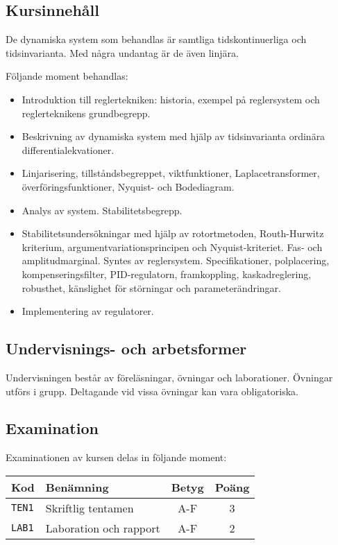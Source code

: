 \subsection*{Kursinnehåll}

De dynamiska system som behandlas är samtliga tidskontinuerliga och
tidsinvarianta. Med några undantag är de även linjära.

Följande moment behandlas:

\begin{itemize}
\tightlist
\item
  Introduktion till reglertekniken: historia, exempel på reglersystem
  och reglerteknikens grundbegrepp.
\item
  Beskrivning av dynamiska system med hjälp av tidsinvarianta ordinära
  differentialekvationer.
\item
  Linjarisering, tillståndsbegreppet, viktfunktioner,
  Laplacetransformer, överföringsfunktioner, Nyquist- och Bodediagram.
\item
  Analys av system. Stabilitetsbegrepp.
\item
  Stabilitetsundersökningar med hjälp av rotortmetoden, Routh-Hurwitz
  kriterium, argumentvariationsprincipen och Nyquist-kriteriet. Fas- och
  amplitudmarginal. Syntes av reglersystem. Specifikationer,
  polplacering, kompenseringsfilter, PID-regulatorn, framkoppling,
  kaskadreglering, robusthet, känslighet för störningar och
  parameterändringar.
\item
  Implementering av regulatorer.
\end{itemize}

\subsection*{Undervisnings- och
arbetsformer}

Undervisningen består av föreläsningar, övningar och laborationer.
Övningar utförs i grupp. Deltagande vid vissa övningar kan vara
obligatoriska.

\subsection*{Examination}

Examinationen av kursen delas in följande moment:

\begin{longtable}[]{@{}llcc@{}}
\toprule
\textsf{Kod} & \textsf{Benämning} & \textsf{Betyg} & \textsf{Poäng}\tabularnewline
\midrule
\endhead
\texttt{TEN1} & Skriftlig tentamen & A-F & 3\tabularnewline
\texttt{LAB1} & Laboration och rapport & A-F & 2\tabularnewline
\bottomrule
\end{longtable}

